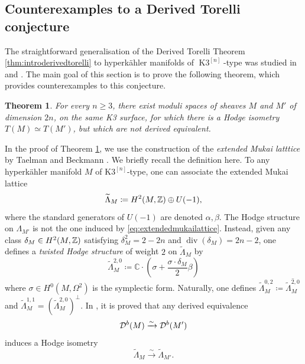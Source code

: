 \documentclass[11pt,twoside]{amsart}
\numberwithin{equation}{section}
\newtheorem{theorem}[dummy]{Theorem}
\theoremstyle{definition}
\theoremstyle{plain}
\newcommand{\CC}{\ensuremath{\mathbb{C}}}
\def\Db{\calD^{b}}
\def\Kn{{\ensuremath{\operatorname{K3}^{[n]}}}}
\def\dv{\operatorname{div}}
\begin{document}
\subsection{Counterexamples to a Derived Torelli conjecture}

The straightforward generalisation of the Derived Torelli Theorem \ref{thm:introderivedtorelli} to hyperk\"ahler manifolds of \Kn-type was studied in \cite{KK24} and \cite{PR23}. The main goal of this section is to prove the following theorem, which provides counterexamples to this conjecture.

\begin{theorem}\label{thm:coexampleDerTorelli}
    For every $n\geq 3$, there exist moduli spaces of sheaves $M$ and $M'$ of dimension $2n$, on the same K3 surface, for which there is a Hodge isometry $T(M)\simeq T(M')$, but which are not derived equivalent.
\end{theorem}

In the proof of Theorem \ref{thm:coexampleDerTorelli}, we use the construction of the \textit{extended Mukai latttice} by Taelman and Beckmann \cite{Tae21,Bec22}. We briefly recall the definition here.
To any hyperk\"ahler manifold $M$ of K$3^{[n]}$-type, one can associate the extended Mukai lattice
\begin{equation}\label{eq:extendedmukailattice}
    \widetilde{\Lambda}_M\coloneqq H^2(M,\mathbb{Z})\oplus U(-1),
\end{equation}
where the standard generators of $U(-1)$ are denoted $\alpha,\beta$. The Hodge structure on $\Lambda_{M'}$ is not the one induced by \eqref{eq:extendedmukailattice}. Instead, given any class $\delta_M\in H^2(M,\mathbb{Z})$ satisfying $\delta_M^2=2-2n$ and $\dv(\delta_M)=2n-2$, one defines a \textit{twisted Hodge structure} of weight $2$ on $\widetilde{\Lambda}_M$ by $$\widetilde{\Lambda}_M^{2,0}\coloneqq \CC\cdot\left(\sigma+\frac{\sigma\cdot\delta_M}{2}\beta\right)$$ where $\sigma\in H^0(M,\Omega^2)$ is the symplectic form. Naturally, one defines $\widetilde{\Lambda}_M^{0,2}\coloneqq \overline{\widetilde{\Lambda}_M^{2,0}}$ and $\widetilde{\Lambda}_M^{1,1}=(\widetilde{\Lambda}_M^{2,0})^\perp$. In \cite[Theorem 9.2]{Bec22}, it is proved that any derived equivalence
$$\Db(M)\xrightarrow{\sim} \Db(M')$$
induces a Hodge isometry
$$\widetilde{\Lambda}_M \xrightarrow{\sim}\widetilde{\Lambda}_{M'}.$$
\end{document}

